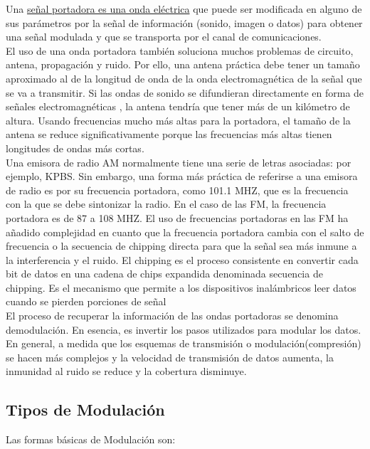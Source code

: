 \documentclass[a4paper]{article}
\begin{document}
Una \href{https://es.wikipedia.org/wiki/Onda_portadora}{señal portadora es una onda eléctrica} que puede ser modificada en alguno de sus parámetros por la señal de información (sonido, imagen o datos) para obtener una señal modulada y que se transporta por el canal de comunicaciones.
\\
El uso de una onda portadora también soluciona muchos problemas de circuito, antena, propagación y ruido. Por ello, una antena práctica debe tener un tamaño aproximado al de la longitud de onda de la onda electromagnética de la señal que se va a transmitir. Si las ondas de sonido se difundieran directamente en forma de señales electromagnéticas , la antena tendría que tener más de un kilómetro de altura. Usando frecuencias mucho más altas para la portadora, el tamaño de la antena se reduce significativamente porque las frecuencias más altas tienen longitudes de ondas más cortas.
\\
Una emisora de radio AM normalmente tiene una serie de letras asociadas: por ejemplo, KPBS. Sin embargo, una forma más práctica de referirse a una emisora de radio es por su frecuencia portadora, como 101.1 MHZ, que es la frecuencia con la que se debe sintonizar la radio. En el caso de las FM, la frecuencia portadora es de 87 a 108 MHZ. El uso de frecuencias portadoras en las FM ha añadido complejidad en cuanto que la frecuencia portadora cambia con el salto de frecuencia o la secuencia de chipping directa para que la señal sea más inmune a la interferencia y el ruido. El chipping es el proceso consistente en convertir cada bit de datos en una cadena de chips expandida denominada secuencia de chipping. Es el mecanismo que permite a los dispositivos inalámbricos leer datos cuando se pierden porciones de señal
\\
El proceso de recuperar la información de las ondas portadoras se denomina demodulación. En esencia, es invertir los pasos utilizados para modular los datos. En general, a medida que los esquemas de transmisión o modulación(compresión) se hacen más complejos y la velocidad de transmisión de datos aumenta, la inmunidad al ruido se reduce y la cobertura disminuye.
 
\subsection{Tipos de Modulaci\'on}

Las formas básicas de Modulación son:
\end{document}
